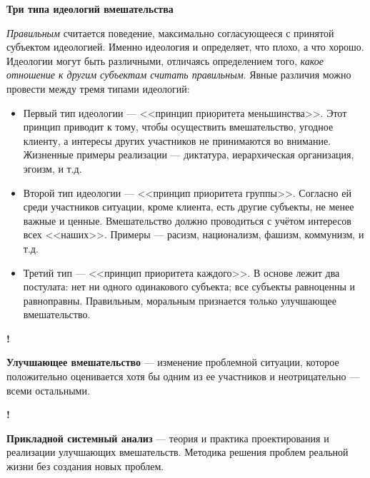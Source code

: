 \documentclass{article}
\newcommand{\note}[1]{\textit{#1}}
\renewcommand{\subsection}[1]{
	\vspace{2em}
	\begin{flushright}
		\large
		\textbf{#1}
	\end{flushright}
	}
\newcommand{\define}[2]{
	\textbf{#1} --- #2
	}
\newcommand{\marked}[2]{
	\begin{flushright}\textbf{!}\hspace{2ex}\vline\hspace{2ex}
		\begin{minipage}{0.9\textwidth}
			\define{#1}{#2}
		\end{minipage}
	\end{flushright}
	}
\begin{document}
\subsection{Три типа идеологий вмешательства}
\note{Правильным} считается поведение, максимально согласующееся с принятой субъектом идеологией. Именно идеология и определяет, что плохо, а что хорошо. Идеологии могут быть различными, отличаясь определением того, \note{какое отношение к другим субъектам считать правильным}. Явные различия можно провести между тремя типами идеологий:
\begin{itemize}
	\item Первый тип идеологии --- <<принцип приоритета меньшинства>>. Этот принцип приводит к тому, чтобы осуществить вмешательство, угодное клиенту, а интересы других участников не принимаются во внимание. Жизненные примеры реализации --- диктатура, иерархическая организация, эгоизм, и т.д.
	\item Второй тип идеологии --- <<принцип приоритета группы>>. Согласно ей среди участников ситуации, кроме клиента, есть другие субъекты, не менее важные и ценные. Вмешательство должно проводиться с учётом интересов всех <<наших>>. Примеры --- расизм, национализм, фашизм, коммунизм, и т.д.
	\item Третий тип --- <<принцип приоритета каждого>>. В основе лежит два постулата: нет ни одного одинакового субъекта; все субъекты равноценны и равноправны. Правильным, моральным признается только улучшающее вмешательство.
\end{itemize}
\marked{Улучшающее вмешательство}{изменение проблемной ситуации, которое положительно оценивается хотя бы одним из ее участников и неотрицательно --- всеми остальными.}
\marked{Прикладной системный анализ}{теория и практика проектирования и реализации улучшающих вмешательств. Методика решения проблем реальной жизни без создания новых проблем.}
\end{document}
